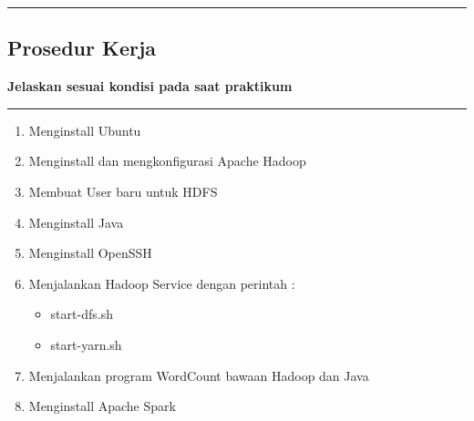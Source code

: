 {\color{gray}\hrule}
\begin{center}
\section{Prosedur Kerja}
\textbf{Jelaskan sesuai kondisi pada saat praktikum}
\end{center}
{\color{gray}\hrule}
\begin{multicols}{2}
\begin{enumerate}
    \item Menginstall Ubuntu
    \item Menginstall dan mengkonfigurasi Apache Hadoop
    \item Membuat User baru untuk HDFS
    \item Menginstall Java
    \item Menginstall OpenSSH
    \item Menjalankan Hadoop Service dengan perintah :
    \begin{itemize}
        \item start-dfs.sh
        \item start-yarn.sh
\end{itemize}
    \item Menjalankan program WordCount bawaan Hadoop dan Java
    \item Menginstall Apache Spark
\end{enumerate}


\end{multicols}


